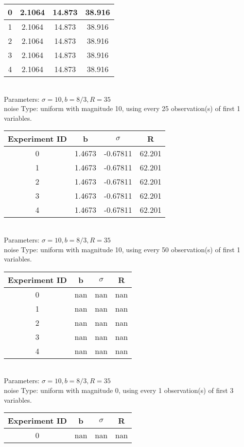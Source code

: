 \begin{multicols}{3}
\begin{tabular}{cccc}
0 & 2.1064 & 14.873 & 38.916\\ \hline 
 1 & 2.1064 & 14.873 & 38.916\\ \hline 
 2 & 2.1064 & 14.873 & 38.916\\ \hline 
 3 & 2.1064 & 14.873 & 38.916\\ \hline 
 4 & 2.1064 & 14.873 & 38.916\\ \hline 
 \end{tabular}\\
Parameters: $\sigma=10, b=8/3, R=35$\\
noise Type: uniform with magnitude 10, using every 25 observation(s) of first 1 variables.\\
\begin{tabular}{cccc}
\hline Experiment ID & b & $\sigma$ & R \\ \hline 
0 & 1.4673 & -0.67811 & 62.201\\ \hline 
 1 & 1.4673 & -0.67811 & 62.201\\ \hline 
 2 & 1.4673 & -0.67811 & 62.201\\ \hline 
 3 & 1.4673 & -0.67811 & 62.201\\ \hline 
 4 & 1.4673 & -0.67811 & 62.201\\ \hline 
 \end{tabular}\\
Parameters: $\sigma=10, b=8/3, R=35$\\
noise Type: uniform with magnitude 10, using every 50 observation(s) of first 1 variables.\\
\begin{tabular}{cccc}
\hline Experiment ID & b & $\sigma$ & R \\ \hline 
0 & nan & nan & nan\\ \hline 
 1 & nan & nan & nan\\ \hline 
 2 & nan & nan & nan\\ \hline 
 3 & nan & nan & nan\\ \hline 
 4 & nan & nan & nan\\ \hline 
 \end{tabular}\\
Parameters: $\sigma=10, b=8/3, R=35$\\
noise Type: uniform with magnitude 0, using every 1 observation(s) of first 3 variables.\\
\begin{tabular}{cccc}
\hline Experiment ID & b & $\sigma$ & R \\ \hline 
0 & nan & nan & nan\\ \hline 

\end{tabular}
\end{multicols}
